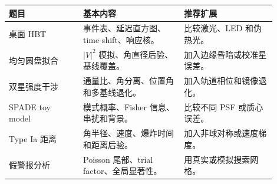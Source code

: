 \begin{longtable}{p{0.25\linewidth}p{0.34\linewidth}p{0.31\linewidth}}
\toprule
题目 & 基本内容 & 推荐扩展 \\
\midrule
桌面 HBT & 事件表、延迟直方图、time-shift、响应核。 & 比较激光、LED 和伪热光。 \\
均匀圆盘拟合 & \(|V|^2\) 模拟、角直径后验、基线覆盖。 & 加入边缘昏暗或校准星误差。 \\
双星强度干涉 & 通量比、角分离、位置角和多基线退化。 & 加入轨道相位和镜像退化。 \\
SPADE toy model & 模式概率、Fisher 信息、串扰和背景。 & 比较不同 PSF 或质心误差。 \\
Type Ia 距离 & 角半径、速度、爆炸时间和距离后验。 & 加入非球对称或速度梯度。 \\
假警报分析 & Poisson 尾部、trial factor、全局显著性。 & 用真实或模拟搜索网格。 \\
\bottomrule
\end{longtable}

